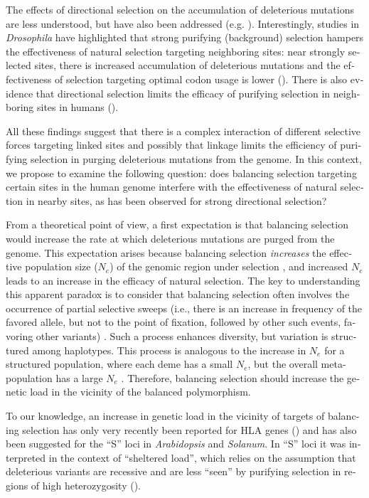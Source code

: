 \begin{refsection}
\begin{otherlanguage}{english}
The effects of directional selection on the accumulation of deleterious mutations are less understood, but have also been addressed (e.g. \cite{Betancourt2002,Chun2011}). Interestingly, studies in \emph{Drosophila} have highlighted that strong purifying (background) selection  hampers the effectiveness of natural selection targeting neighboring sites: near strongly selected sites, there is increased accumulation of deleterious mutations and the effectiveness of selection targeting optimal codon usage is lower (\cite{Betancourt2002}). There is also evidence that directional selection limits the efficacy of purifying selection in neighboring sites in humans (\cite{Chun2011}).


All these findings suggest that there is a complex interaction of different selective forces targeting linked sites and possibly that linkage limits the efficiency of purifying selection in purging deleterious mutations from the genome. In this context, we propose to examine the following question: does balancing selection targeting certain sites in the human genome interfere with the effectiveness of natural selection in nearby sites, as has been observed for strong directional selection? 

From a theoretical point of view, a first expectation is that balancing selection would increase the rate at which deleterious mutations are purged from the genome. This expectation arises because balancing selection \textit{increases} the effective population size ($N_{e}$) of the genomic region under selection \parencite{Charlesworth1997,Roux2013,schierup2000effect}, and increased $N_{e}$ leads to an increase in the efficacy of natural selection. The key to understanding this apparent paradox is to consider that balancing selection often involves the occurrence of partial selective sweeps (i.e., there is an increase in frequency of the favored allele, but not to the point of fixation, followed by other such events, favoring other variants) \parencite{Connallon2013,Albrechtsen2010b}. Such a process enhances diversity, but variation is structured among haplotypes. This process is analogous to the increase in $N_{e}$
for a structured population, where each deme has a small $N_{e}$, but the overall meta-population has a large $N_{e}$ \parencite{Charlesworth1997,Roux2013,schierup2000effect}. Therefore, balancing selection should increase the genetic load in the vicinity of the balanced polymorphism.

To our knowledge, an increase in genetic load in the vicinity of targets of balancing selection has only  very recently been reported for HLA genes (\cite{Mendes2013,Lenz2016}) and has also been suggested for the \enquote{S} loci in \emph{Arabidopsis} and \emph{Solanum}. In \enquote{S} loci it was interpreted in the context of \enquote{sheltered load}, which relies on the assumption that deleterious variants are recessive and are less \enquote{seen} by purifying selection in regions of high heterozygosity (\cite{Stone2004,Roux2013}). 


\end{otherlanguage}
\end{refsection}
